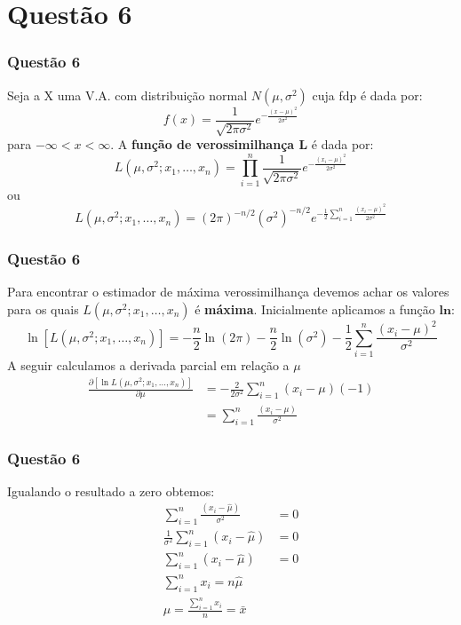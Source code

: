 \documentclass{beamer}\usepackage[]{graphicx}\usepackage[]{color}
\begin{document}
	\section{Questão 6}
		\begin{frame}
			\frametitle{Questão 6}
			Seja a X uma V.A. com distribuição normal $N(\mu,\sigma^{2})$ cuja fdp é dada por:$$f(x) = \frac{1}{\sqrt{2\pi\sigma^{2}}}e^{-\frac{(x-\mu)^{2}}{2\sigma^{2}}}$$para $-\infty < x < \infty$.  A \textbf{função de verossimilhança L} é dada por:
			$$L(\mu,\sigma^{2};x_{1},\dots,x_{n}) = \prod_{i=1}^{n} \frac{1}{\sqrt{2\pi\sigma^{2}}}e^{-\frac{(x_{i}-\mu)^{2}}{2\sigma^{2}}}$$ ou $$L(\mu,\sigma^{2};x_{1},\dots,x_{n}) = (2\pi)^{-n/2}(\sigma^{2})^{-n/2}e^{-\frac{1}{2}\sum_{i=1}^{n}\frac{(x_{i}-\mu)^{2}}{2\sigma^{2}}}$$
		\end{frame}
	
		\begin{frame}
			\frametitle{Questão 6}
			Para encontrar o estimador de máxima verossimilhança devemos achar os valores para os quais $L(\mu,\sigma^{2};x_{1},\dots,x_{n})$ é \textbf{máxima}.  Inicialmente aplicamos a função $\boldsymbol{ln}$:
			$$\ln[L(\mu,\sigma^{2};x_{1},\dots,x_{n})] = -\frac{n}{2}\ln(2\pi)-\frac{n}{2}\ln(\sigma^{2})-\frac{1}{2}\sum_{i=1}^{n}\frac{(x_{i}-\mu)^{2}}{\sigma^{2}}$$
			A seguir calculamos a derivada parcial em relação a $\mu$
			\begin{align*}
				\frac{\partial  [ \ln L(\mu,\sigma^{2};x_{1},\dots,x_{n})]}{\partial \mu} &= -\frac{2}{2\sigma^{2}}\sum_{i=1}^{n}(x_{i} - \mu)(-1)\\
				&= \sum_{i=1}^{n}\frac{(x_{i}-\mu)}{\sigma^{2}}
			\end{align*}
		\end{frame}
	
		\begin{frame}
			\frametitle{Questão 6}
			Igualando o resultado a zero obtemos:
			\begin{align*}
				\sum_{i=1}^{n}\frac{(x_{i}-\hat{\mu})}{\sigma^{2}} &= 0\\
				\frac{1}{\sigma^{2}}\sum_{i=1}^{n}(x_{i}-\hat{\mu}) &= 0\\
				\sum_{i=1}^{n}(x_{i}-\hat{\mu}) &= 0\\
				\sum_{i=1}^{n}x_{i} = n\hat{\mu}\\
				\hat{\mu} = \frac{\sum_{i=1}^{n}x_{i}}{n} = \bar{x}	 			
			\end{align*}
		\end{frame}
	
\end{document}

